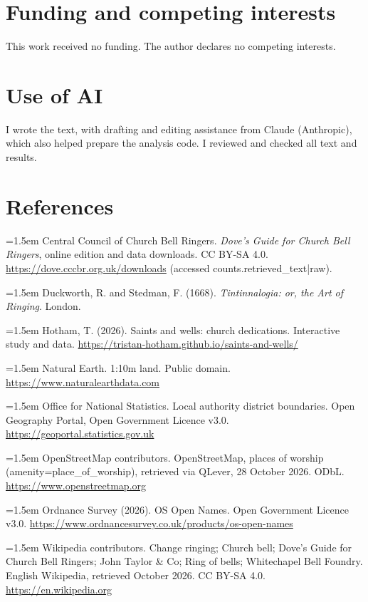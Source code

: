 \documentclass[11pt,a4paper]{article}
\begin{document}
\section*{Funding and competing interests}

This work received no funding. The author declares no competing interests.

\section*{Use of AI}

I wrote the text, with drafting and editing assistance from Claude (Anthropic), which also helped prepare the analysis code. I reviewed and checked all text and results.

\section*{References}
\small
\setlength{\parskip}{0.35em}
\hangindent=1.5em Central Council of Church Bell Ringers. \textit{Dove's Guide for Church Bell Ringers}, online edition and data downloads. CC BY-SA 4.0. \url{https://dove.cccbr.org.uk/downloads} (accessed {{counts.retrieved_text|raw}}).

\hangindent=1.5em Duckworth, R. and Stedman, F. (1668). \textit{Tintinnalogia: or, the Art of Ringing}. London.

\hangindent=1.5em Hotham, T. (2026). Saints and wells: church dedications. Interactive study and data. \url{https://tristan-hotham.github.io/saints-and-wells/}

\hangindent=1.5em Natural Earth. 1:10m land. Public domain. \url{https://www.naturalearthdata.com}

\hangindent=1.5em Office for National Statistics. Local authority district boundaries. Open Geography Portal, Open Government Licence v3.0. \url{https://geoportal.statistics.gov.uk}

\hangindent=1.5em OpenStreetMap contributors. OpenStreetMap, places of worship (amenity=place\_of\_worship), retrieved via QLever, 28 October 2026. ODbL. \url{https://www.openstreetmap.org}

\hangindent=1.5em Ordnance Survey (2026). OS Open Names. Open Government Licence v3.0. \url{https://www.ordnancesurvey.co.uk/products/os-open-names}

\hangindent=1.5em Wikipedia contributors. Change ringing; Church bell; Dove's Guide for Church Bell Ringers; John Taylor \& Co; Ring of bells; Whitechapel Bell Foundry. English Wikipedia, retrieved October 2026. CC BY-SA 4.0. \url{https://en.wikipedia.org}
\end{document}
